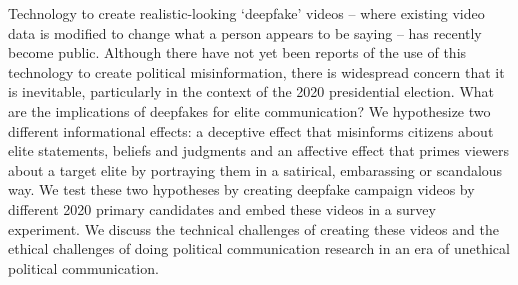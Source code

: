 Technology to create realistic-looking ‘deepfake’ videos -- where existing video data is modified to change what a person appears to be saying -- has recently become public. Although there have not yet been reports of the use of this technology to create political misinformation, there is widespread concern that it is inevitable, particularly in the context of the 2020 presidential election. What are the implications of deepfakes for elite communication? We hypothesize two different informational effects: a deceptive effect that misinforms citizens about elite statements, beliefs and judgments and an affective effect that primes viewers about a target elite by portraying them in a satirical, embarassing or scandalous way. We test these two hypotheses by creating deepfake campaign videos by different 2020 primary candidates and embed these videos in a survey experiment. We discuss the technical challenges of creating these videos and the ethical challenges of doing political communication research in an era of unethical political communication.
